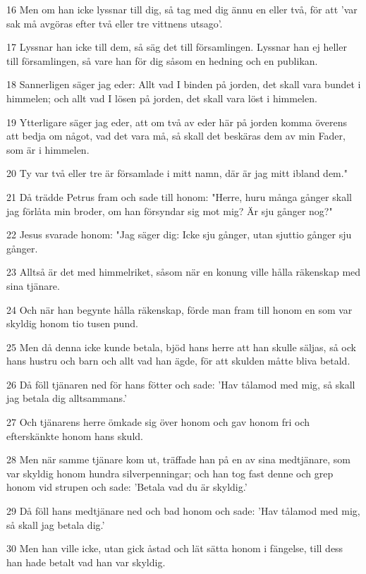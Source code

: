 \par 16 Men om han icke lyssnar till dig, så tag med dig ännu en eller två, för att 'var sak må avgöras efter två eller tre vittnens utsago'.
\par 17 Lyssnar han icke till dem, så säg det till församlingen. Lyssnar han ej heller till församlingen, så vare han för dig såsom en hedning och en publikan.
\par 18 Sannerligen säger jag eder: Allt vad I binden på jorden, det skall vara bundet i himmelen; och allt vad I lösen på jorden, det skall vara löst i himmelen.
\par 19 Ytterligare säger jag eder, att om två av eder här på jorden komma överens att bedja om något, vad det vara må, så skall det beskäras dem av min Fader, som är i himmelen.
\par 20 Ty var två eller tre är församlade i mitt namn, där är jag mitt ibland dem."
\par 21 Då trädde Petrus fram och sade till honom: "Herre, huru många gånger skall jag förlåta min broder, om han försyndar sig mot mig? Är sju gånger nog?"
\par 22 Jesus svarade honom: "Jag säger dig: Icke sju gånger, utan sjuttio gånger sju gånger.
\par 23 Alltså är det med himmelriket, såsom när en konung ville hålla räkenskap med sina tjänare.
\par 24 Och när han begynte hålla räkenskap, förde man fram till honom en som var skyldig honom tio tusen pund.
\par 25 Men då denna icke kunde betala, bjöd hans herre att han skulle säljas, så ock hans hustru och barn och allt vad han ägde, för att skulden måtte bliva betald.
\par 26 Då föll tjänaren ned för hans fötter och sade: 'Hav tålamod med mig, så skall jag betala dig alltsammans.'
\par 27 Och tjänarens herre ömkade sig över honom och gav honom fri och efterskänkte honom hans skuld.
\par 28 Men när samme tjänare kom ut, träffade han på en av sina medtjänare, som var skyldig honom hundra silverpenningar; och han tog fast denne och grep honom vid strupen och sade: 'Betala vad du är skyldig.'
\par 29 Då föll hans medtjänare ned och bad honom och sade: 'Hav tålamod med mig, så skall jag betala dig.'
\par 30 Men han ville icke, utan gick åstad och lät sätta honom i fängelse, till dess han hade betalt vad han var skyldig.
